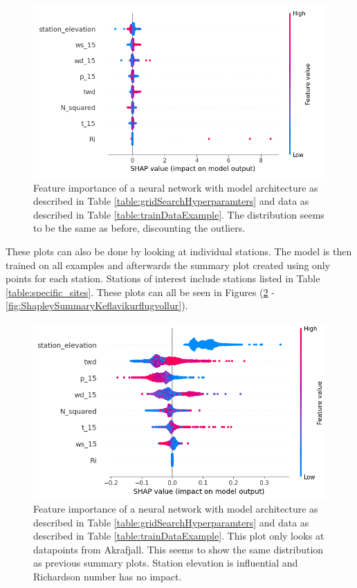 \begin{figure}
    \centering
    \includegraphics[scale = 0.6]{Figures/shap_plots/summary_plot_190924_full_10ms.png}
    \caption[Summary feature importance of a neural network using entire dataset.]{Feature importance of a neural network with model architecture as described in Table \ref{table:gridSearchHyperparamters} and data as described in Table \ref{table:trainDataExample}. The distribution seems to be the same as before, discounting the outliers.}
    \label{fig:ShapleySummary3}
\end{figure}

These plots can also be done by looking at individual stations. The model is then trained on all examples and afterwards the summary plot created using only points for each station. Stations of interest include stations listed in Table \ref{table:specific_sites}. These plots can all be seen in Figures (\ref{fig:ShapleySummaryAkrafjall} - \ref{fig:ShapleySummaryKeflavikurflugvollur}).

\begin{figure}
    \centering
    \includegraphics[scale = 0.6]{Figures/shap_plots/summary_plot_31572.png}
    \caption[Summary feature importance of a neural network only looking at AWS at Akrafjall.]{Feature importance of a neural network with model architecture as described in Table \ref{table:gridSearchHyperparamters} and data as described in Table \ref{table:trainDataExample}. This plot only looks at datapoints from Akrafjall. This seems to show the same distribution as previous summary plots. Station elevation is influential and Richardson number has no impact.}
    \label{fig:ShapleySummaryAkrafjall}
\end{figure}

